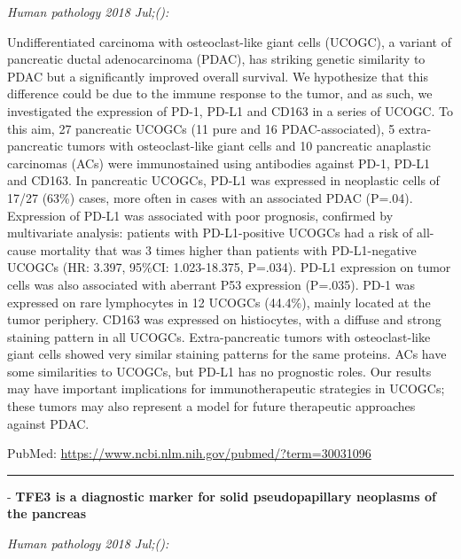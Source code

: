\documentclass[]{article}
\begin{document}
\emph{Human pathology 2018 Jul;():}

Undifferentiated carcinoma with osteoclast-like giant cells (UCOGC), a
variant of pancreatic ductal adenocarcinoma (PDAC), has striking genetic
similarity to PDAC but a significantly improved overall survival. We
hypothesize that this difference could be due to the immune response to
the tumor, and as such, we investigated the expression of PD-1, PD-L1
and CD163 in a series of UCOGC. To this aim, 27 pancreatic UCOGCs (11
pure and 16 PDAC-associated), 5 extra-pancreatic tumors with
osteoclast-like giant cells and 10 pancreatic anaplastic carcinomas
(ACs) were immunostained using antibodies against PD-1, PD-L1 and CD163.
In pancreatic UCOGCs, PD-L1 was expressed in neoplastic cells of 17/27
(63\%) cases, more often in cases with an associated PDAC (P=.04).
Expression of PD-L1 was associated with poor prognosis, confirmed by
multivariate analysis: patients with PD-L1-positive UCOGCs had a risk of
all-cause mortality that was 3 times higher than patients with
PD-L1-negative UCOGCs (HR: 3.397, 95\%CI: 1.023-18.375, P=.034). PD-L1
expression on tumor cells was also associated with aberrant P53
expression (P=.035). PD-1 was expressed on rare lymphocytes in 12 UCOGCs
(44.4\%), mainly located at the tumor periphery. CD163 was expressed on
histiocytes, with a diffuse and strong staining pattern in all UCOGCs.
Extra-pancreatic tumors with osteoclast-like giant cells showed very
similar staining patterns for the same proteins. ACs have some
similarities to UCOGCs, but PD-L1 has no prognostic roles. Our results
may have important implications for immunotherapeutic strategies in
UCOGCs; these tumors may also represent a model for future therapeutic
approaches against PDAC.

PubMed: \url{https://www.ncbi.nlm.nih.gov/pubmed/?term=30031096}

{}

{}

\begin{center}\rule{0.5\linewidth}{\linethickness}\end{center}

 - \textbf{TFE3 is a diagnostic marker for solid pseudopapillary
neoplasms of the pancreas}

\emph{Human pathology 2018 Jul;():}
\end{document}
